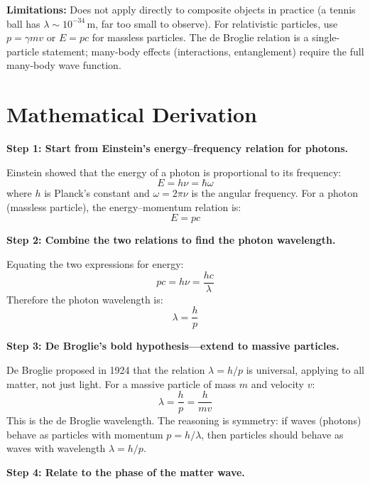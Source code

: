 \documentclass[11pt,openright]{book}
\begin{document}
\textbf{Limitations:} Does not apply directly to composite objects in practice (a tennis ball has $\lambda \sim 10^{-34}\,\text{m}$, far too small to observe). For relativistic particles, use $p = \gamma mv$ or $E = pc$ for massless particles. The de Broglie relation is a single-particle statement; many-body effects (interactions, entanglement) require the full many-body wave function.


\section*{Mathematical Derivation}

\textbf{Step 1: Start from Einstein's energy--frequency relation for photons.}

Einstein showed that the energy of a photon is proportional to its frequency:
\begin{equation}
E = h\nu = \hbar\omega
\end{equation}
where $h$ is Planck's constant and $\omega = 2\pi\nu$ is the angular frequency. For a photon (massless particle), the energy--momentum relation is:
\begin{equation}
E = pc
\end{equation}

\textbf{Step 2: Combine the two relations to find the photon wavelength.}

Equating the two expressions for energy:
\begin{equation}
pc = h\nu = \frac{hc}{\lambda}
\end{equation}
Therefore the photon wavelength is:
\begin{equation}
\lambda = \frac{h}{p}
\end{equation}

\textbf{Step 3: De Broglie's bold hypothesis---extend to massive particles.}

De Broglie proposed in 1924 that the relation $\lambda = h/p$ is universal, applying to all matter, not just light. For a massive particle of mass $m$ and velocity $v$:
\begin{equation}
\lambda = \frac{h}{p} = \frac{h}{mv}
\end{equation}
This is the de Broglie wavelength. The reasoning is symmetry: if waves (photons) behave as particles with momentum $p = h/\lambda$, then particles should behave as waves with wavelength $\lambda = h/p$.

\textbf{Step 4: Relate to the phase of the matter wave.}
\end{document}
